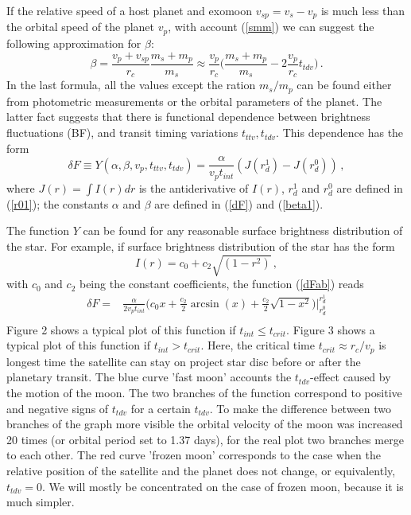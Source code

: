\documentclass[12pt]{article}
\begin{document}
 If the relative speed of a host planet and exomoon $v_{sp}=v_s-v_p$ is much less than the orbital speed of the planet $v_p$, with account (\ref{smm}) we can suggest the following approximation for $\beta$:
\begin{equation}\label{beta1}
\beta=\frac{v_p+v_{sp}}{r_c}\frac{m_s+m_p}{m_s}\approx \frac{v_p}{r_c}\Big(\frac{m_s+m_p}{m_s}-2\frac{v_p}{r_c}t_{{tdv}}\Big)\,.
\end{equation}
In the last formula, all the values except the ration $m_s/m_p$ can be found either from photometric measurements or the orbital parameters of the planet. The latter fact suggests that there is functional dependence between brightness fluctuations (BF), and transit timing variations $t_{{ttv}},   t_{{tdv}}$. This dependence has the form
\begin{equation}\label{dFab}
\delta F\equiv Y(\alpha,\beta,v_p, t_{{ttv}}, t_{{tdv}})=\frac{\alpha}{v_p t_{int}}\left(J(r^1_d)-
J(r^0_d)\right)\,,
\end{equation}
where $J(r)=\int I(r)dr$ is the antiderivative of $I(r)$, $r^1_d$ and $r^0_d$ are defined in (\ref{r01}); the constants $\alpha$ and $\beta$ are defined in (\ref{dF}) and (\ref{beta1}).
 
 The function $Y$ can be found for any reasonable surface brightness distribution of the star. For example, if surface brightness distribution of the star has the form
\begin{equation}\label{ic0c2c4}
I(r)=c_0 + c_2\sqrt{(1-r^2)}\,,
\end{equation}
with $c_0$ and $c_2$ being the constant coefficients,
the function (\ref{dFab}) reads
\begin{equation}\label{dFab1}\begin{array}{ll}
\delta F=&\displaystyle \frac{\alpha}{2 v_p t_{int}}\Big(c_0x+\frac{c_2}{2}\arcsin(x)+\frac{c_2}{2}\sqrt{1-x^2}\Big)\Big|_{r^0_d}^{r^1_d}\\[3mm] 
\end{array}\end{equation}
Figure 2 shows a typical plot of this function if $t_{{int}}\leq t_{{crit}}$. Figure 3 shows a typical plot of this function if $t_{{int}}>t_{{crit}}$. Here, the critical time $t_{{crit}}\approx r_c/v_p$ is longest time the satellite can stay on project star disc before or after the planetary transit. The blue curve 'fast moon' accounts the $t_{{tdv}}$-effect caused by the motion of the moon. The two branches of the function correspond to positive and negative signs of $t_{{tdv}}$ for a certain $t_{{tdv}}$. To make the difference between two branches of the graph more visible the orbital velocity of the moon was increased 20 times (or orbital period set to 1.37 days), for the real plot two branches merge to each other. The red curve 'frozen moon' corresponds to the case when the relative position of the satellite and the planet does not change, or equivalently, $t_{{tdv}}=0$. We will mostly be concentrated on the case of frozen moon, because it is much simpler.
 
\end{document}
